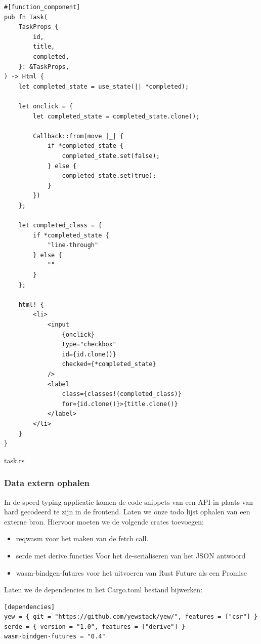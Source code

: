 \begin{listing}
\begin{verbatim}
#[function_component]
pub fn Task(
    TaskProps {
        id,
        title,
        completed,
    }: &TaskProps,
) -> Html {
    let completed_state = use_state(|| *completed);

    let onclick = {
        let completed_state = completed_state.clone();

        Callback::from(move |_| {
            if *completed_state {
                completed_state.set(false);
            } else {
                completed_state.set(true);
            }
        })
    };

    let completed_class = {
        if *completed_state {
            "line-through"
        } else {
            ""
        }
    };

    html! {
        <li>
            <input
                {onclick}
                type="checkbox"
                id={id.clone()}
                checked={*completed_state}
            />
            <label
                class={classes!(completed_class)}
                for={id.clone()}>{title.clone()}
            </label>
        </li>
    }
}
\end{verbatim}
\caption{task.rs}
\end{listing}

\clearpage

\subsubsection{Data extern ophalen}

In de speed typing applicatie komen de code snippets van een API in plaats van hard gecodeerd te
zijn in de frontend. Laten we onze todo lijst ophalen van een externe bron. Hiervoor moeten we de
volgende crates toevoegen:
\begin{itemize}
  \item reqwasm voor het maken van de fetch call.
  \item serde met derive functies Voor het de-serialiseren van het JSON antwoord
  \item wasm-bindgen-futures voor het uitvoeren van Rust Future als een Promise
\end{itemize}

Laten we de dependencies in het Cargo.toml bestand bijwerken:

\begin{verbatim}
[dependencies]
yew = { git = "https://github.com/yewstack/yew/", features = ["csr"] }
serde = { version = "1.0", features = ["derive"] }
wasm-bindgen-futures = "0.4"
\end{verbatim}

